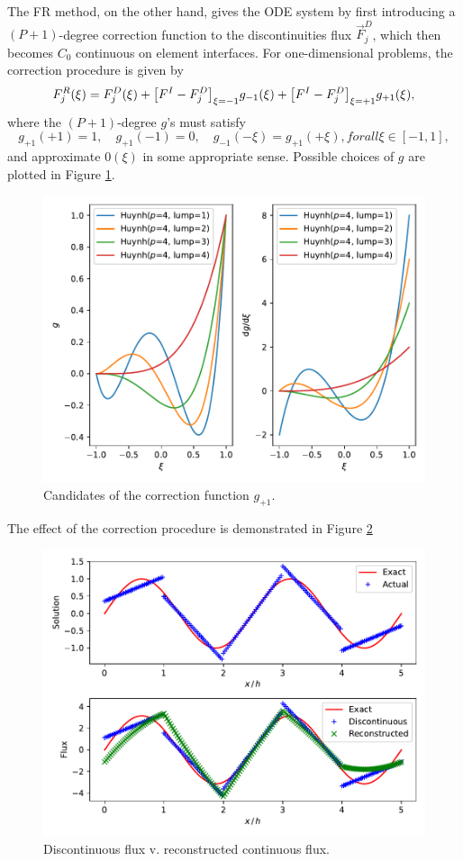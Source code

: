 \documentclass[10pt,draft]{article}
\begin{document}
%
The FR method, on the other hand, gives the ODE system by first introducing a $(P+1)$-degree correction function to the discontinuities flux $\vec{F}_j^{D}$, which then becomes $C_0$ continuous on element interfaces.
%
For one-dimensional problems, the correction procedure is given by
$$
F_j^{R}(\xi)=F_j^{D}(\xi) + \qty[F^{I}-F_j^{D}]_{\xi=-1} g_{-1}(\xi) + \qty[F^{I}-F_j^{D}]_{\xi=+1} g_{+1}(\xi),
$$
where the $(P+1)$-degree $g$'s must satisfy
$$
g_{+1}(+1)=1,\quad
g_{+1}(-1)=0,\quad
g_{-1}(-\xi)=g_{+1}(+\xi), forall \xi\in[-1,1],
$$
and approximate $0(\xi)$ in some appropriate sense.
Possible choices of $g$ are plotted in Figure \ref{fr:lumping}.
%
\begin{figure}[H]
  \centering
  \includegraphics[width=.8\textwidth]{./fr/HuynhLumping.pdf}
  \caption{Candidates of the correction function $g_{+1}$.}
  \label{fr:lumping}
\end{figure}
%
The effect of the correction procedure is demonstrated in Figure \ref{fr:compare}
\begin{figure}[H]
  \centering
  \includegraphics[width=.8\textwidth]{./fr/FRonLegendreRoots.pdf}
  \caption{Discontinuous flux v. reconstructed continuous flux.}
  \label{fr:compare}
\end{figure}
\end{document}
